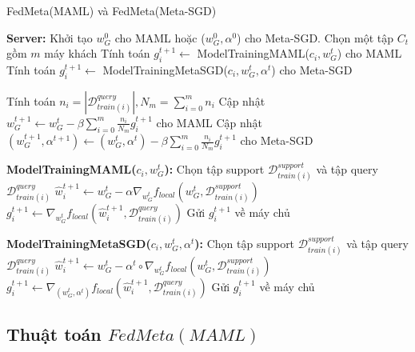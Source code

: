\begin{algorithm}
    \caption{FedMeta(MAML) và FedMeta(Meta-SGD) \cite{chen2018federated}} \label{alg:fedmeta}
    \begin{algorithmic}[1]
        \State \textbf{Server:}
        \State Khởi tạo $w_G^0$ cho MAML hoặc ($w_G^0, \alpha^0$) cho Meta-SGD.
            \State Chọn một tập $C_t$ gồm $m$ máy khách
                \State Tính toán $g_i^{t+1} \gets$ ModelTrainingMAML($c_i, w_G^t$) cho MAML
                \State Tính toán $g_i^{t+1} \gets$ ModelTrainingMetaSGD($c_i, w_G^t, \alpha^t$) cho Meta-SGD
            \EndFor

            \State

            \State Tính toán {$n_i = \left| \mathcal{D}_{train(i)}^{query} \right|, N_m = \sum_{i=0}^m n_i$}
            \State Cập nhật $w_G^{t+1} \gets w_G^t - \beta \sum_{i=0}^m \frac{n_i}{N_m} g_i^{t+1}$ cho MAML
            \State Cập nhật $(w_G^{t+1}, \alpha^{t+1}) \gets (w_G^t, \alpha^t) - \beta \sum_{i=0}^m \frac{n_i}{N_m} g_i^{t+1}$ cho Meta-SGD
        \EndFor

        \Statex

        \State\textbf{ModelTrainingMAML($c_i, w_G^t$):} 
        \State Chọn tập support $\mathcal{D}_{train(i)}^{support}$ và tập query $\mathcal{D}_{train(i)}^{query}$
        \State $\hat{w}_i^{t+1} \gets w_G^t - \alpha\nabla_{w_G^t} f_{local}(w_G^t, \mathcal{D}_{train(i)}^{support})$
        \State $g_i^{t+1} \gets \nabla_{w_G^t} f_{local}(\hat{w}_i^{t+1}, \mathcal{D}_{train(i)}^{query})$
        \State Gửi $g_i^{t+1}$ về máy chủ

        \Statex

        \State\textbf{ModelTrainingMetaSGD($c_i, w_G^t, \alpha^t$):} 
        \State Chọn tập support $\mathcal{D}_{train(i)}^{support}$ và tập query $\mathcal{D}_{train(i)}^{query}$
        \State $\hat{w}_i^{t+1} \gets w_G^t - \alpha^t \circ \nabla_{w_G^t} f_{local}(w_G^t, \mathcal{D}_{train(i)}^{support})$
        \State $g_i^{t+1} \gets \nabla_{(w_G^t,\alpha^t)} f_{local}(\hat{w}_i^{t+1}, \mathcal{D}_{train(i)}^{query})$
        \State Gửi $g_i^{t+1}$ về máy chủ
    \end{algorithmic}
\end{algorithm}

\subsection{Thuật toán $FedMeta(MAML)$}

